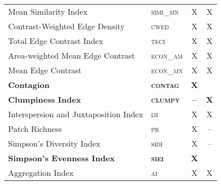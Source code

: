 \begin{itemize}
\begin{table}[]
\begin{tabular}{@{}llcc@{}}
Mean Similarity Index                 & \textsc{simi\_mn       } & X               & X           \\
Contrast-Weighted Edge Density        & \textsc{cwed           } & X               & X           \\
Total Edge Contrast Index             & \textsc{teci           } & X               & X           \\
Area-weighted Mean Edge Contrast      & \textsc{econ\_am       } & X               & X           \\
Mean Edge Contrast                    & \textsc{econ\_mn       } & X               & X           \\
{\bf Contagion}                       & \bfseries{\scshape{contag}} & {\bf X}         & {\bf }      \\
{\bf Clumpiness Index}                & \bfseries{\scshape{clumpy}} & {\bf --}        & {\bf X}     \\
Interspersion and Juxtaposition Index & \textsc{iji            } & X               & X           \\
Patch Richness                        & \textsc{pr             } & X               & --            \\
Simpson’s Diversity Index             & \textsc{sidi           } & X               & --            \\
{\bf Simpson’s Evenness Index}        & \bfseries{\scshape{siei}     } & {\bf X}         & {\bf }      \\
Aggregation Index                     & \textsc{ai             } & X               & X           \\ \bottomrule
\end{tabular}
\end{table}


\end{itemize}
